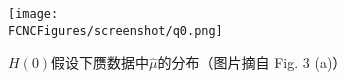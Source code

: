 \begin{figure}[H]
\centering
\texttt{[image: \\FCNCFigures/screenshot/q0.png]}
\caption{$H(0)$假设下赝数据中$\hat\mu$的分布（图片摘自\cite{CCGV} Fig. 3 (a)）}
\label{fig:q0}
\end{figure}
